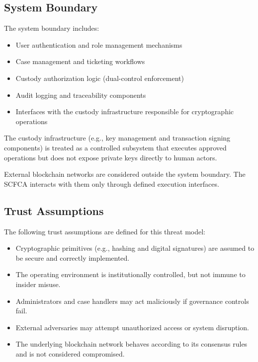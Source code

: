 \documentclass[12pt,a4paper]{report}
\begin{document}
\subsection{System Boundary}

The system boundary includes:

\begin{itemize}
    \item User authentication and role management mechanisms
    \item Case management and ticketing workflows
    \item Custody authorization logic (dual-control enforcement)
    \item Audit logging and traceability components
    \item Interfaces with the custody infrastructure responsible for cryptographic operations
\end{itemize}

The custody infrastructure (e.g., key management and transaction signing components) is treated as a controlled subsystem that executes approved operations but does not expose private keys directly to human actors.

External blockchain networks are considered outside the system boundary. The SCFCA interacts with them only through defined execution interfaces.

\subsection{Trust Assumptions}

The following trust assumptions are defined for this threat model:

\begin{itemize}
    \item Cryptographic primitives (e.g., hashing and digital signatures) are assumed to be secure and correctly implemented.
    \item The operating environment is institutionally controlled, but not immune to insider misuse.
    \item Administrators and case handlers may act maliciously if governance controls fail.
    \item External adversaries may attempt unauthorized access or system disruption.
    \item The underlying blockchain network behaves according to its consensus rules and is not considered compromised.
\end{itemize}
\end{document}
